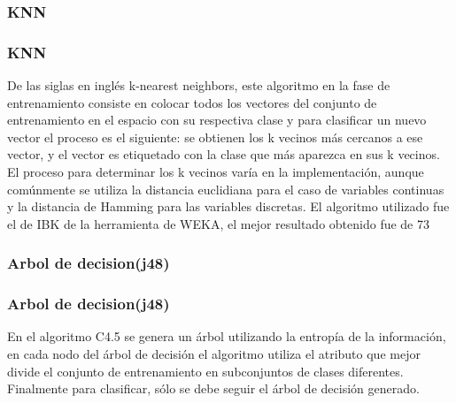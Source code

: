 \documentclass{beamer}
\begin{document}
\subsubsection{KNN}
\begin{frame}
\frametitle{KNN}
De las siglas en inglés k-nearest neighbors, este algoritmo en la fase de entrenamiento consiste en colocar todos los vectores del conjunto de entrenamiento en el espacio con su respectiva clase y para clasificar un nuevo vector el proceso es el siguiente: se obtienen los k vecinos más cercanos a ese vector, y el vector es etiquetado con la clase que más aparezca en sus k vecinos. El proceso para determinar los k vecinos varía en la implementación, aunque comúnmente se utiliza la distancia euclidiana para el caso de variables continuas y la distancia de Hamming para las variables discretas. El algoritmo utilizado fue el de IBK de la herramienta de WEKA, el mejor resultado obtenido fue de 73%
\end{frame}
\subsubsection{Arbol de decision(j48)}
\begin{frame}
\frametitle{Arbol de decision(j48)}
En el algoritmo C4.5 se genera un árbol utilizando la entropía de la información, en cada nodo del árbol de decisión el algoritmo utiliza el atributo que mejor divide el conjunto de entrenamiento en subconjuntos de clases diferentes. Finalmente para clasificar, sólo se debe seguir el árbol de decisión generado.
\end{frame}
\end{document}
